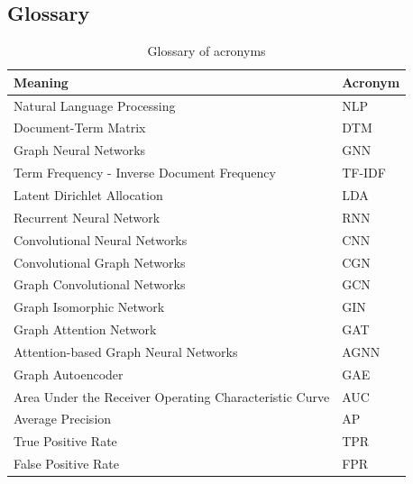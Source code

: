 \documentclass[smallextended]{svjour3}
\begin{document}
	\pagebreak	
	\begin{appendices}
		
		\renewcommand{\thetable}{\thesection\arabic{table}}
		\renewcommand\thefigure{\thesection.\arabic{figure}}    
		
		\section{Glossary} \label{sec:glossary}
		
		\setcounter{table}{0}
		\setcounter{figure}{0}    
		\begin{table}[!t]
			\centering
			\caption{Glossary of acronyms}
			\label{table:glossary} 

			\captionsetup{justification=centering}
			\begin{tabular}{@{}ll@{}}
				\toprule
				Meaning                                                & Acronym \\ \midrule
				Natural Language Processing                            & NLP     \\
				Document-Term Matrix                                   & DTM     \\
				Graph Neural Networks                                  & GNN     \\
				Term Frequency - Inverse Document Frequency            & TF-IDF  \\
				Latent Dirichlet Allocation                            & LDA     \\
				Recurrent Neural Network                               & RNN     \\
				Convolutional Neural Networks                          & CNN     \\
				Convolutional Graph Networks                           & CGN     \\
				Graph Convolutional Networks                           & GCN     \\
				Graph Isomorphic Network                               & GIN     \\
				Graph Attention Network                                & GAT     \\
				Attention-based Graph Neural Networks                  & AGNN    \\
				Graph Autoencoder                                      & GAE     \\
				Area Under the Receiver Operating Characteristic Curve & AUC     \\
				Average Precision                                      & AP      \\
				True Positive Rate                                     & TPR     \\
				False Positive Rate                                    & FPR     \\ \bottomrule
			\end{tabular}
		\end{table}
		

\end{appendices}
\end{document}
